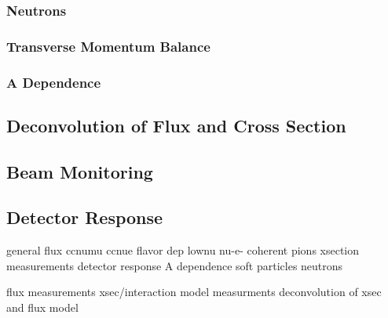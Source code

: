 \subsubsection{Neutrons}
\subsubsection{Transverse Momentum Balance}
\subsubsection{A Dependence}
\subsection{Deconvolution of Flux and Cross Section}
\subsection{Beam Monitoring}
\subsection{Detector Response}

general
flux
ccnumu
ccnue
flavor dep
lownu
nu-e-
coherent pions
xsection measurements
detector response
A dependence
soft particles
neutrons

flux measurements
xsec/interaction model measurments
deconvolution of xsec and flux model